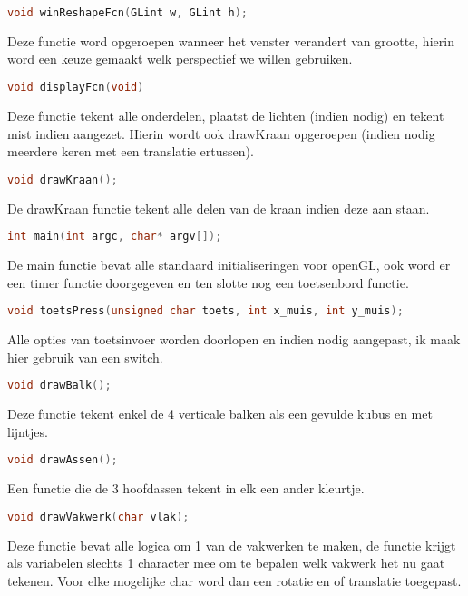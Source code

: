 \documentclass[a4paper, 12pt, one column]{article}
\begin{document}
\begin{lstlisting}[language=C]
    void winReshapeFcn(GLint w, GLint h);
\end{lstlisting}
Deze functie word opgeroepen wanneer het venster verandert van grootte, hierin word
een keuze gemaakt welk perspectief we willen gebruiken.

\begin{lstlisting}[language=C]
    void displayFcn(void)
\end{lstlisting}
Deze functie tekent alle onderdelen, plaatst de lichten (indien nodig) en tekent mist indien aangezet.
Hierin wordt ook drawKraan opgeroepen (indien nodig meerdere keren met een translatie ertussen).

\begin{lstlisting}[language=C]
    void drawKraan();
\end{lstlisting}
De drawKraan functie tekent alle delen van de kraan indien deze aan staan.

\begin{lstlisting}[language=C]
    int main(int argc, char* argv[]);
\end{lstlisting}
De main functie bevat alle standaard initialiseringen voor openGL, ook word er een timer functie 
doorgegeven en ten slotte nog een toetsenbord functie.

\begin{lstlisting}[language=C]
    void toetsPress(unsigned char toets, int x_muis, int y_muis);
\end{lstlisting}
Alle opties van toetsinvoer worden doorlopen en indien nodig aangepast, ik maak hier gebruik van 
een switch.

\begin{lstlisting}[language=C]
    void drawBalk();
\end{lstlisting}
Deze functie tekent enkel de 4 verticale balken als een gevulde kubus en met lijntjes.

\begin{lstlisting}[language=C]
    void drawAssen();
\end{lstlisting}
Een functie die de 3 hoofdassen tekent in elk een ander kleurtje.

\begin{lstlisting}[language=C]
    void drawVakwerk(char vlak);
\end{lstlisting}
Deze functie bevat alle logica om 1 van de vakwerken te maken, de functie krijgt als 
variabelen slechts 1 character mee om te bepalen welk vakwerk het nu gaat tekenen.
Voor elke mogelijke char word dan een rotatie en of translatie toegepast.
\end{document}
